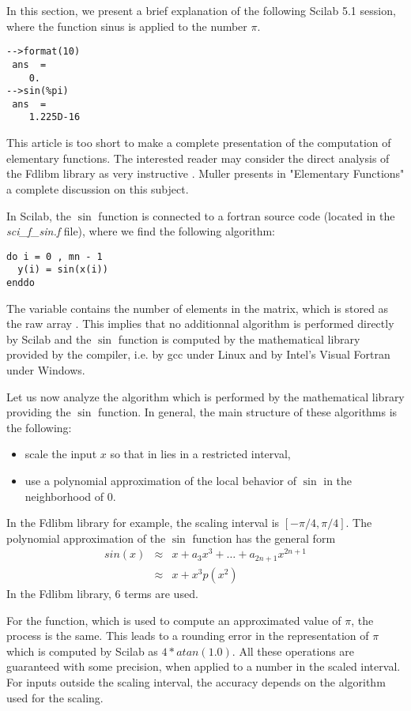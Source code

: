 In this section, we present a brief explanation of the following 
Scilab 5.1 session, where the function sinus is applied to the 
number $\pi$.

\begin{lstlisting}
-->format(10)
 ans  =
    0.  
-->sin(%pi)
 ans  =
    1.225D-16  
\end{lstlisting}

This article is too short to make a complete presentation 
of the computation of elementary functions. The interested 
reader may consider the direct analysis of the Fdlibm library
as very instructive \cite{fdlibm}.
Muller presents in "Elementary Functions" \cite{261217}
a complete discussion on this subject.

In Scilab, the $\sin$ function is connected to a 
fortran source code (located in the \emph{sci\_f\_sin.f} file), where 
we find the following algorithm:
\begin{lstlisting}
do i = 0 , mn - 1
  y(i) = sin(x(i))
enddo
\end{lstlisting}
The  variable contains the number of elements in the matrix,
which is stored as the raw array . This implies that 
no additionnal algorithm is performed directly by Scilab and 
the $\sin$ function is computed by the mathematical library provided 
by the compiler, i.e. by gcc under Linux and by Intel's Visual Fortran under Windows.

Let us now analyze the algorithm which is performed by the mathematical library 
providing the $\sin$ function. 
In general, the main structure of these algorithms is the following:
\begin{itemize}
\item scale the input $x$ so that in lies in a restricted
interval, 
\item use a polynomial approximation of the local 
behavior of $\sin$ in the neighborhood of 0.
\end{itemize}

In the Fdlibm library for example, the scaling interval is 
$[-\pi/4,\pi/4]$. 
The polynomial approximation of the $\sin$ function has the general form
\begin{eqnarray}
sin(x) &\approx& x + a_3x^3 + \ldots + a_{2n+1} x^{2n+1}\\
&\approx & x + x^3 p(x^2)
\end{eqnarray}
In the Fdlibm library, 6 terms are used.

For the  function, which is 
used to compute an approximated value of $\pi$, the process is the same.
This leads to a rounding error in the representation of $\pi$ which is 
computed by Scilab as $4*atan(1.0)$.
All these operations are guaranteed with some precision, when applied to a 
number in the scaled interval. For inputs outside the scaling interval, the accuracy
depends on the algorithm used for the scaling.


